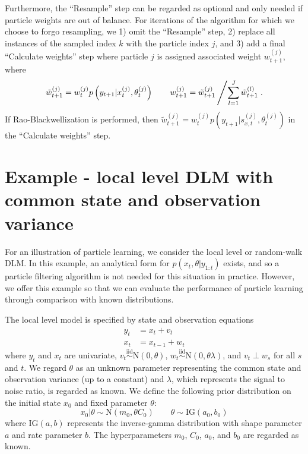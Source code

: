\documentclass{article}
\begin{document}
Furthermore, the ``Resample'' step can be regarded as optional and only needed if particle weights are out of balance. For iterations of the algorithm for which we choose to forgo resampling, we 1) omit the ``Resample'' step, 2) replace all instances of the sampled index $k$ with the particle index $j$, and 3) add a final ``Calculate weights'' step where particle $j$ is assigned associated weight $w_{t+1}^{(j)}$, where \[\tilde{w}_{t+1}^{(j)} = w_t^{(j)}p\left(y_{t+1}|x_t^{(j)},\theta_t^{(j)}\right) \qquad w_{t+1}^{(j)} = \tilde{w}_{t+1}^{(j)} \left/ \sum_{l=1}^J \tilde{w}_{t+1}^{(l)}\right..\] If Rao-Blackwellization is performed, then $\tilde{w}_{t+1}^{(j)} = w_t^{(j)}p\left(y_{t+1}|s_{x,t}^{(j)},\theta_t^{(j)}\right)$ in the ``Calculate weights'' step.

\section{Example - local level DLM with common state and observation variance} \label{sec:ll}

For an illustration of particle learning, we consider the local level or random-walk DLM. In this example, an analytical form for $p(x_t,\theta|y_{1:t})$ exists, and so a particle filtering algorithm is not needed for this situation in practice. However, we offer this example so that we can evaluate the performance of particle learning through comparison with known distributions.

The local level model is specified by state and observation equations
\begin{align}
y_t &= x_t + v_t \label{eqn:llobs} \\
x_t &= x_{t-1} + w_t \label{eqn:llstate}
\end{align}
where $y_t$ and $x_t$ are univariate, $v_t \stackrel{\mbox{iid}}{\sim} \mbox{N}(0,\theta)$, $w_t \stackrel{\mbox{iid}}{\sim} \mbox{N}(0,\theta\lambda)$, and $v_t \perp w_s$ for all $s$ and $t$. We regard $\theta$ as an unknown parameter representing the common state and observation variance (up to a constant) and $\lambda$, which represents the signal to noise ratio, is regarded as known. We define the following prior distribution on the initial state $x_0$ and fixed parameter $\theta$:
\begin{equation}
x_0|\theta \sim \mbox{N}(m_0,\theta C_0) \qquad \theta \sim \mbox{IG}(a_0,b_0) \label{eqn:llprior}
\end{equation}
where $\mbox{IG}(a,b)$ represents the inverse-gamma distribution with shape parameter $a$ and rate parameter $b$. The hyperparameters $m_0$, $C_0$, $a_0$, and $b_0$ are regarded as known.
\end{document}
